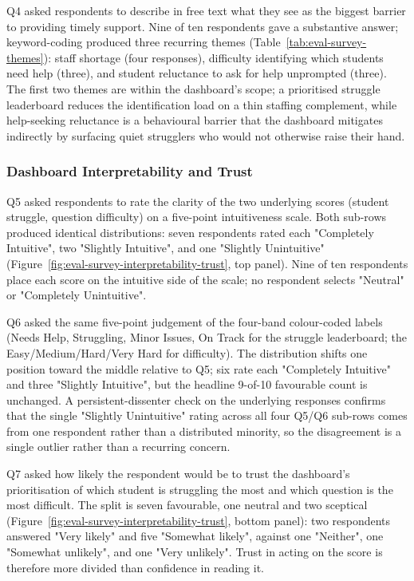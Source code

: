 Q4 asked respondents to describe in free text what they see as the biggest barrier to providing timely support. Nine of ten respondents gave a substantive answer; keyword-coding produced three recurring themes (Table~\ref{tab:eval-survey-themes}): staff shortage (four responses), difficulty identifying which students need help (three), and student reluctance to ask for help unprompted (three). The first two themes are within the dashboard's scope; a prioritised struggle leaderboard reduces the identification load on a thin staffing complement, while help-seeking reluctance is a behavioural barrier that the dashboard mitigates indirectly by surfacing quiet strugglers who would not otherwise raise their hand.


\subsubsection{Dashboard Interpretability and Trust}

Q5 asked respondents to rate the clarity of the two underlying scores (student struggle, question difficulty) on a five-point intuitiveness scale. Both sub-rows produced identical distributions: seven respondents rated each "Completely Intuitive", two "Slightly Intuitive", and one "Slightly Unintuitive" (Figure~\ref{fig:eval-survey-interpretability-trust}, top panel). Nine of ten respondents place each score on the intuitive side of the scale; no respondent selects "Neutral" or "Completely Unintuitive". 

Q6 asked the same five-point judgement of the four-band colour-coded labels (Needs Help, Struggling, Minor Issues, On Track for the struggle leaderboard; the Easy/Medium/Hard/Very Hard for difficulty). The distribution shifts one position toward the middle relative to Q5; six rate each "Completely Intuitive" and three "Slightly Intuitive", but the headline 9-of-10 favourable count is unchanged. A persistent-dissenter check on the underlying responses confirms that the single "Slightly Unintuitive" rating across all four Q5/Q6 sub-rows comes from one respondent rather than a distributed minority, so the disagreement is a single outlier rather than a recurring concern.

Q7 asked how likely the respondent would be to trust the dashboard's prioritisation of which student is struggling the most and which question is the most difficult. The split is seven favourable, one neutral and two sceptical (Figure~\ref{fig:eval-survey-interpretability-trust}, bottom panel): two respondents answered "Very likely" and five "Somewhat likely", against one "Neither", one "Somewhat unlikely", and one "Very unlikely". Trust in acting on the score is therefore more divided than confidence in reading it.


